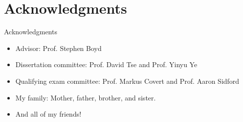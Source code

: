 \documentclass[10pt]{beamer}
\theoremstyle{remark}
\theoremstyle{definition}
\begin{document}
\section{Acknowledgments}
\begin{frame}{Acknowledgments}{}

	\begin{itemize}
		\item<1-> Advisor: Prof. Stephen Boyd
		\item<2-> Dissertation committee: Prof. David Tse and Prof. Yinyu Ye
		\item<3-> Qualifying exam committee: Prof. Markus Covert and Prof. Aaron Sidford
		\item<4-> My family: Mother, father, brother, and sister.
		\item<5-> And all of my friends!
	\end{itemize}

\end{frame}

\fi

{\1
\begin{frame}
\end{frame}}

{\1
\begin{frame}
\end{frame}}

\begin{frame}

	\footnotesize
    
	

\end{frame}
\end{document}
